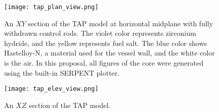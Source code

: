 \begin{figure}[htp!] %
  \centering
		  \texttt{[image: tap\_plan\_view.png]}
  \caption{An $XY$ section of the \gls{TAP} model at horizontal midplane 
  with fully withdrawn control rods. The violet color represents zirconium 
hydride, and the yellow represents fuel salt. The blue color shows 
Hastelloy-N, a material used for the vessel wall, and the white color 
is the air. In this proposal, all figures of the core 
were generated using the built-in SERPENT plotter.}
  \label{fig:tap-serpent-plan}
\end{figure}
\begin{figure}[htp!] %
  \centering
		  \texttt{[image: tap\_elev\_view.png]}
  \caption{An $XZ$ section of the \gls{TAP} model.}
  \label{fig:tap-serpent-elev}
\end{figure}

